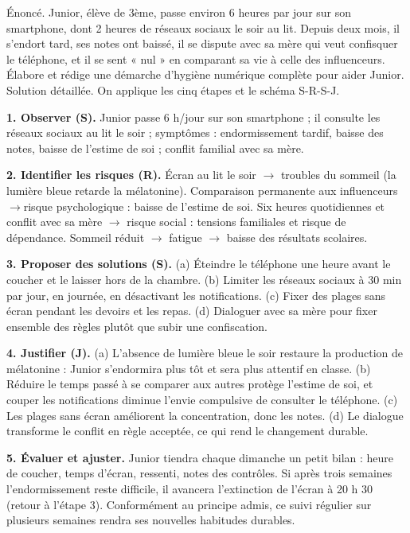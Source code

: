 \documentclass[11pt]{article}
\begin{document}
\begin{exoresolu}
Énoncé. Junior, élève de 3ème, passe environ 6 heures par jour sur son smartphone, dont 2 heures de réseaux sociaux le soir au lit. Depuis deux mois, il s'endort tard, ses notes ont baissé, il se dispute avec sa mère qui veut confisquer le téléphone, et il se sent « nul » en comparant sa vie à celle des influenceurs. Élabore et rédige une démarche d'hygiène numérique complète pour aider Junior.
\tcblower
Solution détaillée. On applique les cinq étapes et le schéma S-R-S-J.

\textbf{1. Observer (S).} Junior passe 6 h/jour sur son smartphone ; il consulte les réseaux sociaux au lit le soir ; symptômes : endormissement tardif, baisse des notes, baisse de l'estime de soi ; conflit familial avec sa mère.

\textbf{2. Identifier les risques (R).} Écran au lit le soir $\rightarrow$ troubles du sommeil (la lumière bleue retarde la mélatonine). Comparaison permanente aux influenceurs $\rightarrow{ }$risque psychologique : baisse de l'estime de soi. Six heures quotidiennes et conflit avec sa mère $\rightarrow$ risque social : tensions familiales et risque de dépendance. Sommeil réduit $\rightarrow$ fatigue $\rightarrow$ baisse des résultats scolaires.

\textbf{3. Proposer des solutions (S).} (a) Éteindre le téléphone une heure avant le coucher et le laisser hors de la chambre. (b) Limiter les réseaux sociaux à 30 min par jour, en journée, en désactivant les notifications. (c) Fixer des plages sans écran pendant les devoirs et les repas. (d) Dialoguer avec sa mère pour fixer ensemble des règles plutôt que subir une confiscation.

\textbf{4. Justifier (J).} (a) L'absence de lumière bleue le soir restaure la production de mélatonine : Junior s'endormira plus tôt et sera plus attentif en classe. (b) Réduire le temps passé à se comparer aux autres protège l'estime de soi, et couper les notifications diminue l'envie compulsive de consulter le téléphone. (c) Les plages sans écran améliorent la concentration, donc les notes. (d) Le dialogue transforme le conflit en règle acceptée, ce qui rend le changement durable.

\textbf{5. Évaluer et ajuster.} Junior tiendra chaque dimanche un petit bilan : heure de coucher, temps d'écran, ressenti, notes des contrôles. Si après trois semaines l'endormissement reste difficile, il avancera l'extinction de l'écran à 20 h 30 (retour à l'étape 3). Conformément au principe admis, ce suivi régulier sur plusieurs semaines rendra ses nouvelles habitudes durables.
\end{exoresolu}
\end{document}
